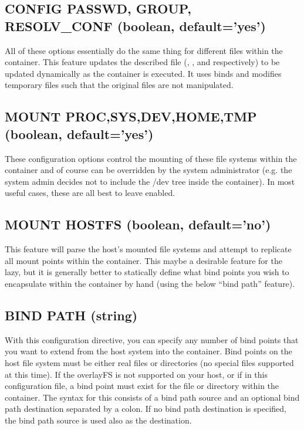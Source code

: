 \documentclass[letterpaper,10pt,english]{sphinxmanual}
\begin{document}
\subsection{CONFIG PASSWD, GROUP, RESOLV\_CONF (boolean, default=’yes’)}
\label{\detokenize{the_singularity_config_file:config-passwd-group-resolv-conf-boolean-default-yes}}
All of these options essentially do the same thing for different files
within the container. This feature updates the described file (,  , and 
respectively) to be updated dynamically as the container is executed. It
uses binds and modifies temporary files such that the original files are
not manipulated.


\subsection{MOUNT PROC,SYS,DEV,HOME,TMP (boolean, default=’yes’)}
\label{\detokenize{the_singularity_config_file:mount-proc-sys-dev-home-tmp-boolean-default-yes}}
These configuration options control the mounting of these file systems
within the container and of course can be overridden by the system
administrator (e.g. the system admin decides not to include the /dev
tree inside the container). In most useful cases, these are all best to
leave enabled.


\subsection{MOUNT HOSTFS (boolean, default=’no’)}
\label{\detokenize{the_singularity_config_file:mount-hostfs-boolean-default-no}}
This feature will parse the host’s mounted file systems and attempt to
replicate all mount points within the container. This maybe a desirable
feature for the lazy, but it is generally better to statically define
what bind points you wish to encapsulate within the container by hand
(using the below “bind path” feature).


\subsection{BIND PATH (string)}
\label{\detokenize{the_singularity_config_file:bind-path-string}}
With this configuration directive, you can specify any number of bind
points that you want to extend from the host system into the
container. Bind points on the host file system must be either real
files or directories (no special files supported at this time). If the
overlayFS is not supported on your host, or if  in this configuration
file, a bind point must exist for the file or directory within the
container.
The syntax for this consists of a bind path source and an optional
bind path destination separated by a colon. If no bind path
destination is specified, the bind path source is used also as the
destination.
\end{document}
